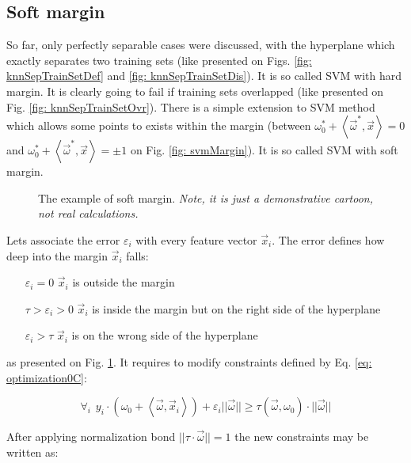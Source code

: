 \subsection{Soft margin}
\label{sec: svmLinearSoft}

So far, only perfectly separable cases were discussed, with the hyperplane which exactly separates two training sets (like presented on Figs. \ref{fig: knnSepTrainSetDef} and \ref{fig: knnSepTrainSetDis}). It is so called SVM with hard margin. It is clearly going to fail if training sets overlapped (like presented on Fig. \ref{fig: knnSepTrainSetOvr}). There is a simple extension to SVM method which allows some points to exists within the margin (between $\omega_0^* + \left<\vec\omega^*, \vec x\right> = 0$ and $\omega_0^* + \left<\vec\omega^*, \vec x\right> = \pm 1$ on Fig. \ref{fig: svmMargin}). It is so called SVM with soft margin. 

\begin{figure}
 \centering
 \caption{The example of soft margin. {\it Note, it is just a demonstrative cartoon, not real calculations.}}
 \label{fig: svmSoftMargin}
\end{figure}

Lets associate the error $\varepsilon_i$ with every feature vector $\vec x_i$. The error defines how deep into the margin $\vec x_i$ falls:

\begin{itemize}
 \item[$\varepsilon_i = 0$] $\vec x_i$ is outside the margin
 \item[$\tau > \varepsilon_i > 0$] $\vec x_i$ is inside the margin but on the right side of the hyperplane
 \item[$\varepsilon_i > \tau$] $\vec x_i$ is on the wrong side of the hyperplane
\end{itemize}

as presented on Fig. \ref{fig: svmSoftMargin}. It requires to modify constraints defined by Eq. \ref{eq: optimization0C}:

\begin{equation}
  \forall_i\hspace{5pt} y_i \cdot \left(\omega_0 + \left<\vec\omega, \vec x_i\right>\right) + \varepsilon_i||\vec\omega||\geq \tau(\vec\omega, \omega_0)\cdot ||\vec\omega|| 
\end{equation}

After applying normalization bond $||\tau\cdot\vec\omega|| = 1$ the new constraints may be written as:

